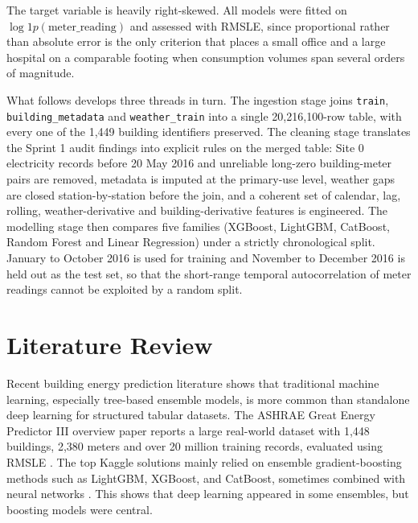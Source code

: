 \documentclass{article}
\begin{document}
The target variable is heavily right-skewed. All models were fitted on \(\log1p(\text{meter\_reading})\) and assessed with RMSLE, since proportional rather than absolute error is the only criterion that places a small office and a large hospital on a comparable footing when consumption volumes span several orders of magnitude.

What follows develops three threads in turn. The ingestion stage joins \texttt{train}, \texttt{building\_metadata} and \texttt{weather\_train} into a single 20,216,100-row table, with every one of the 1,449 building identifiers preserved. The cleaning stage translates the Sprint 1 audit findings into explicit rules on the merged table: Site 0 electricity records before 20 May 2016 and unreliable long-zero building-meter pairs are removed, metadata is imputed at the primary-use level, weather gaps are closed station-by-station before the join, and a coherent set of calendar, lag, rolling, weather-derivative and building-derivative features is engineered. The modelling stage then compares five families (XGBoost, LightGBM, CatBoost, Random Forest and Linear Regression) under a strictly chronological split. January to October 2016 is used for training and November to December 2016 is held out as the test set, so that the short-range temporal autocorrelation of meter readings cannot be exploited by a random split.


\section{Literature Review} 
Recent building energy prediction literature shows that traditional machine learning, especially tree-based ensemble models, is more common than standalone deep learning for structured tabular datasets. The ASHRAE Great Energy Predictor III overview paper reports a large real-world dataset with 1,448 buildings, 2,380 meters and over 20 million training records, evaluated using RMSLE \cite{miller2020}. The top Kaggle solutions mainly relied on ensemble gradient-boosting methods such as LightGBM, XGBoost, and CatBoost, sometimes combined with neural networks \cite{budslab}. This shows that deep learning appeared in some ensembles, but boosting models were central. 
\end{document}
